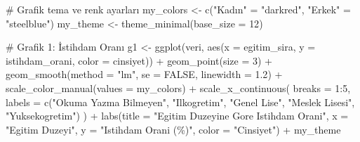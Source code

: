 \documentclass[
  11pt,
  a4paper,
  DIV=11,
  numbers=noendperiod]{scrartcl}
\newenvironment{Shaded}{\begin{snugshade}}{\end{snugshade}}
\newcommand{\AttributeTok}[1]{\textcolor[rgb]{0.40,0.45,0.13}{#1}}
\newcommand{\CommentTok}[1]{\textcolor[rgb]{0.37,0.37,0.37}{#1}}
\newcommand{\ConstantTok}[1]{\textcolor[rgb]{0.56,0.35,0.01}{#1}}
\newcommand{\DecValTok}[1]{\textcolor[rgb]{0.68,0.00,0.00}{#1}}
\newcommand{\FloatTok}[1]{\textcolor[rgb]{0.68,0.00,0.00}{#1}}
\newcommand{\FunctionTok}[1]{\textcolor[rgb]{0.28,0.35,0.67}{#1}}
\newcommand{\NormalTok}[1]{\textcolor[rgb]{0.00,0.23,0.31}{#1}}
\newcommand{\OtherTok}[1]{\textcolor[rgb]{0.00,0.23,0.31}{#1}}
\newcommand{\SpecialCharTok}[1]{\textcolor[rgb]{0.37,0.37,0.37}{#1}}
\newcommand{\StringTok}[1]{\textcolor[rgb]{0.13,0.47,0.30}{#1}}
\begin{document}
\begin{Shaded}
\begin{Highlighting}[]
\CommentTok{\# Grafik tema ve renk ayarları}
\NormalTok{my\_colors }\OtherTok{\textless{}{-}} \FunctionTok{c}\NormalTok{(}\StringTok{"Kadın"} \OtherTok{=} \StringTok{"darkred"}\NormalTok{, }\StringTok{"Erkek"} \OtherTok{=} \StringTok{"steelblue"}\NormalTok{)}
\NormalTok{my\_theme }\OtherTok{\textless{}{-}} \FunctionTok{theme\_minimal}\NormalTok{(}\AttributeTok{base\_size =} \DecValTok{12}\NormalTok{)}

\CommentTok{\# Grafik 1: İstihdam Oranı}
\NormalTok{g1 }\OtherTok{\textless{}{-}} \FunctionTok{ggplot}\NormalTok{(veri, }\FunctionTok{aes}\NormalTok{(}\AttributeTok{x =}\NormalTok{ egitim\_sira, }\AttributeTok{y =}\NormalTok{ istihdam\_orani, }\AttributeTok{color =}\NormalTok{ cinsiyet)) }\SpecialCharTok{+}
  \FunctionTok{geom\_point}\NormalTok{(}\AttributeTok{size =} \DecValTok{3}\NormalTok{) }\SpecialCharTok{+}
  \FunctionTok{geom\_smooth}\NormalTok{(}\AttributeTok{method =} \StringTok{"lm"}\NormalTok{, }\AttributeTok{se =} \ConstantTok{FALSE}\NormalTok{, }\AttributeTok{linewidth =} \FloatTok{1.2}\NormalTok{) }\SpecialCharTok{+}
  \FunctionTok{scale\_color\_manual}\NormalTok{(}\AttributeTok{values =}\NormalTok{ my\_colors) }\SpecialCharTok{+}
  \FunctionTok{scale\_x\_continuous}\NormalTok{(}
    \AttributeTok{breaks =} \DecValTok{1}\SpecialCharTok{:}\DecValTok{5}\NormalTok{,}
    \AttributeTok{labels =} \FunctionTok{c}\NormalTok{(}\StringTok{"Okuma Yazma Bilmeyen"}\NormalTok{, }\StringTok{"Ilkogretim"}\NormalTok{, }\StringTok{"Genel Lise"}\NormalTok{, }\StringTok{"Meslek Lisesi"}\NormalTok{, }\StringTok{"Yuksekogretim"}\NormalTok{)}
\NormalTok{  ) }\SpecialCharTok{+}
  \FunctionTok{labs}\NormalTok{(}\AttributeTok{title =} \StringTok{"Egitim Duzeyine Gore Istihdam Orani"}\NormalTok{,}
       \AttributeTok{x =} \StringTok{"Egitim Duzeyi"}\NormalTok{, }\AttributeTok{y =} \StringTok{"Istihdam Orani (\%)"}\NormalTok{, }\AttributeTok{color =} \StringTok{"Cinsiyet"}\NormalTok{) }\SpecialCharTok{+}
\NormalTok{  my\_theme}


\end{Highlighting}
\end{Shaded}
\end{document}
